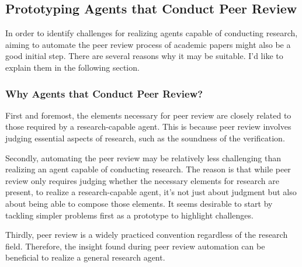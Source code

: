 \subsection{Prototyping Agents that Conduct Peer Review}
In order to identify challenges for realizing agents capable of conducting research, aiming to automate the peer review process of academic papers might also be a good initial step. There are several reasons why it may be suitable. I'd like to explain them in the following section.

\subsubsection{Why Agents that Conduct Peer Review?}

First and foremost, the elements necessary for peer review are closely related to those required by a research-capable agent. This is because peer review involves judging essential aspects of research, such as the soundness of the verification.

Secondly, automating the peer review may be relatively less challenging than realizing an agent capable of conducting research. The reason is that while peer review only requires judging whether the necessary elements for research are present, to realize a research-capable agent, it's not just about judgment but also about being able to compose those elements. It seems desirable to start by tackling simpler problems first as a prototype to highlight challenges.


Thirdly, peer review is a widely practiced convention regardless of the research field. Therefore, the insight found during peer review automation can be beneficial to realize a general research agent. 


